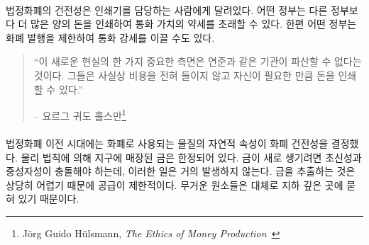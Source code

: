 \paragraph{}
\begin{comment}	
	The hardness of fiat currency depends on who is in charge of the
	respective printing presses. Some governments might be more willing to
	print large amounts of currency than others, resulting in a weaker
	currency. Other governments might be more restrictive in their money
	printing, resulting in harder currency.
\end{comment}
법정화폐의 건전성은 인쇄기를 담당하는 사람에게 달려있다. 
어떤 정부는 다른 정부보다 더 많은 양의 돈을 인쇄하여 통화 가치의 약세를 초래할 수 있다.
한편 어떤 정부는 화폐 발행을 제한하여 통화 강세를 이끌 수도 있다.


\begin{samepage}\begin{quotation}
		\begin{comment}	
			\enquote{One important aspect of this new reality is that institutions like
				the Fed cannot go bankrupt. They can print any amount of money that
				they might need for themselves at virtually zero cost.}
		\end{comment}
		\enquote{이 새로운 현실의 한 가지 중요한 측면은 연준과 같은 기관이 파산할 수 없다는 것이다. 
		그들은 사실상 비용을 전혀 들이지 않고 자신이 필요한 만큼 돈을 인쇄할 수 있다.}
		\begin{flushright} -- 요르그 귀도 홀스만\footnote{Jörg Guido Hülsmann, \textit{The
					Ethics of Money Production}~\cite{hulsmann2008ethics}}
\end{flushright}\end{quotation}\end{samepage}

\paragraph{}
\begin{comment}	
	Before we had fiat currencies, the soundness of money was determined by
	the natural properties of the stuff which we used as money. The amount
	of gold on earth is limited by the laws of physics. Gold is rare because
	supernovae and neutron star collisions are rare. The \enquote{flow} of gold is
	limited because extracting it is quite an effort. Being a heavy element
	it is mostly buried deep underground.
\end{comment}
법정화폐 이전 시대에는 화폐로 사용되는 물질의 자연적 속성이 화폐 건전성을 결정했다. 
물리 법칙에 의해 지구에 매장된 금은 한정되어 있다.
금이 새로 생기려면 초신성과 중성자성이 충돌해야 하는데, 이러한 일은 거의 발생하지 않는다.
금을 추출하는 것은 상당히 어렵기 때문에 공급이 제한적이다.
무거운 원소들은 대체로 지하 깊은 곳에 묻혀 있기 때문이다.


